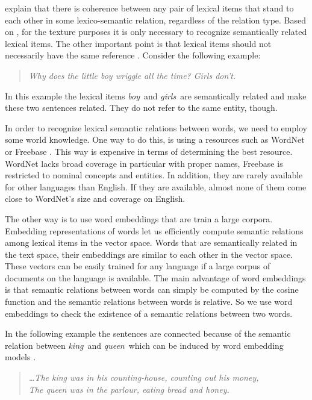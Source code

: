 \cite{halliday76} explain that there is coherence between any pair of lexical items that stand to each other in some lexico-semantic relation, regardless of the relation type. 
Based on \cite{halliday76}, for the texture purposes it is only necessary to recognize semantically related lexical items. 
The other important point is that lexical items should not necessarily have the same reference \cite{halliday76}. 
Consider the following example: 

\begin{quote}
\emph{Why does the little boy wriggle all the time? Girls don't.}
\end{quote}

In this example the lexical items \emph{boy}\ and \emph{girls}\ are semantically related and make these two sentences related.  
They do not refer to the same entity, though. 

In order to recognize lexical semantic relations between words, we need to employ some world knowledge. 
One way to do this, is using a resources such as WordNet \cite{fellbaum98} or Freebase \cite{bollacker08}.  
This way is expensive in terms of determining the best resource.  
WordNet lacks broad coverage in particular with proper names, Freebase is restricted to nominal concepts and entities. 
In addition, they are rarely available for other languages than English.
If they are available, almost none of them come close to WordNet's size and coverage on English. 

The other way is to use word embeddings that are train a large corpora. 
Embedding representations of words let us efficiently compute semantic relations among lexical items in the vector space. 
Words that are semantically related in the text space, their embeddings are similar to each other in the vector space. 
These vectors can be easily trained for any language if a large corpus of documents on the language is available. 
The main advantage of word embeddings is that semantic relations between words can simply be computed by the cosine function and the semantic relations between words is relative.  
So we use word embeddings to check the existence of a semantic relations between two words. 

In the following example the sentences are connected because of the semantic relation between \emph{king}\ and \emph{queen}\ which can be induced by word embedding models \cite{mikolov13c,pennington14}.

\begin{quote}
  \emph{\ldots The king was in his counting-house, counting out his money,\\ 
    The queen was in the parlour, eating bread and honey.} 
\end{quote}


